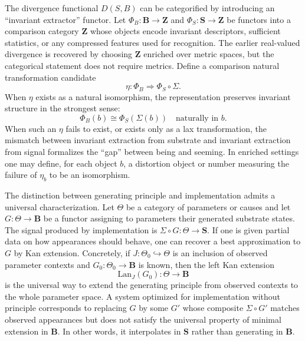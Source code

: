 \documentclass[11pt]{article}
\begin{document}
The divergence functional $D(S,B)$ can be categorified by introducing an ``invariant extractor'' functor. Let $\Phi_B:\mathbf{B}\to\mathbf{Z}$ and $\Phi_S:\mathbf{S}\to\mathbf{Z}$ be functors into a comparison category $\mathbf{Z}$ whose objects encode invariant descriptors, sufficient statistics, or any compressed features used for recognition. The earlier real-valued divergence is recovered by choosing $\mathbf{Z}$ enriched over metric spaces, but the categorical statement does not require metrics. Define a comparison natural transformation candidate
\[
\eta : \Phi_B \Rightarrow \Phi_S\circ \Sigma.
\]
When $\eta$ exists as a natural isomorphism, the representation preserves invariant structure in the strongest sense:
\[
\Phi_B(b) \cong \Phi_S(\Sigma(b))
\quad \text{naturally in } b.
\]
When such an $\eta$ fails to exist, or exists only as a lax transformation, the mismatch between invariant extraction from substrate and invariant extraction from signal formalizes the ``gap'' between being and seeming. In enriched settings one may define, for each object $b$, a distortion object or number measuring the failure of $\eta_b$ to be an isomorphism.

The distinction between generating principle and implementation admits a universal characterization. Let $\Theta$ be a category of parameters or causes and let $G:\Theta\to\mathbf{B}$ be a functor assigning to parameters their generated substrate states. The signal produced by implementation is $\Sigma\circ G:\Theta\to\mathbf{S}$. If one is given partial data on how appearances should behave, one can recover a best approximation to $G$ by Kan extension. Concretely, if $J:\Theta_0\hookrightarrow\Theta$ is an inclusion of observed parameter contexts and $G_0:\Theta_0\to\mathbf{B}$ is known, then the left Kan extension
\[
\mathrm{Lan}_J(G_0):\Theta\to\mathbf{B}
\]
is the universal way to extend the generating principle from observed contexts to the whole parameter space. A system optimized for implementation without principle corresponds to replacing $G$ by some $G'$ whose composite $\Sigma\circ G'$ matches observed appearances but does not satisfy the universal property of minimal extension in $\mathbf{B}$. In other words, it interpolates in $\mathbf{S}$ rather than generating in $\mathbf{B}$.
\end{document}
